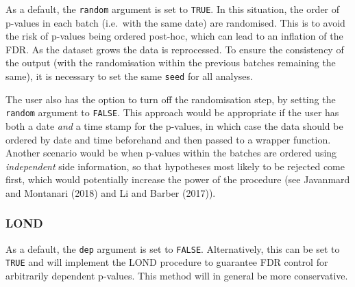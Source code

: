 \documentclass[
]{article}
\begin{document}
As a default, the \texttt{random} argument is set to \texttt{TRUE}. In
this situation, the order of p-values in each batch (i.e.~with the same
date) are randomised. This is to avoid the risk of p-values being
ordered post-hoc, which can lead to an inflation of the FDR. As the
dataset grows the data is reprocessed. To ensure the consistency of the
output (with the randomisation within the previous batches remaining the
same), it is necessary to set the same \texttt{seed} for all analyses.

The user also has the option to turn off the randomisation step, by
setting the \texttt{random} argument to \texttt{FALSE}. This approach
would be appropriate if the user has both a date \emph{and} a time stamp
for the p-values, in which case the data should be ordered by date and
time beforehand and then passed to a wrapper function. Another scenario
would be when p-values within the batches are ordered using
\emph{independent} side information, so that hypotheses most likely to
be rejected come first, which would potentially increase the power of
the procedure (see Javanmard and Montanari (2018) and Li and Barber
(2017)).

\hypertarget{lond}{%
\subsubsection{LOND}\label{lond}}

As a default, the \texttt{dep} argument is set to \texttt{FALSE}.
Alternatively, this can be set to \texttt{TRUE} and will implement the
LOND procedure to guarantee FDR control for arbitrarily dependent
p-values. This method will in general be more conservative.
\end{document}
